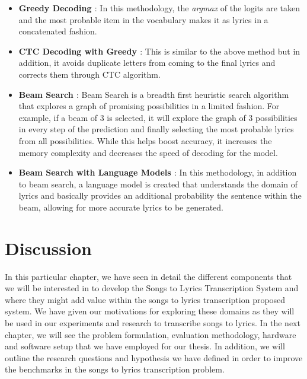 \begin{itemize}
    \item \textbf{Greedy Decoding \cite{zhang2023dive}} : In this methodology, the \textit{argmax} of the logits are taken and the most probable item in the vocabulary makes it as lyrics in a concatenated fashion.
    \item \textbf{CTC Decoding with Greedy \cite{sutskever2014sequence}}: This is similar to the above method but in addition, it avoids duplicate letters from coming to the final lyrics and corrects them through CTC algorithm.
    \item \textbf{Beam Search \cite{zhang2023dive}} : Beam Search is a breadth first heuristic search algorithm that explores a graph of promising possibilities in a limited fashion. For example, if a beam of 3 is selected, it will explore the graph of 3 possibilities in every step of the prediction and finally selecting the most probable lyrics from all possibilities. While this helps boost accuracy, it increases the memory complexity and decreases the speed of decoding for the model.
    \item  \textbf{Beam Search with Language Models \cite{sutskever2014sequence}}: In this methodology, in addition to beam search, a language model is created that understands the domain of lyrics and basically provides an additional probability the sentence within the beam, allowing for more accurate lyrics to be generated. 
\end{itemize}

\section{Discussion}%
\label{sec:foundationaltheorydiscussion}

In this particular chapter, we have seen in detail the different components that we will be interested in to develop the Songs to Lyrics Transcription System and where they might add value within the songs to lyrics transcription proposed system. We have given our motivations for exploring these domains as they will be used in our experiments and research to transcribe songs to lyrics. In the next chapter, we will see the problem formulation, evaluation methodology, hardware and software setup that we have employed for our thesis. In addition, we will outline the research questions and hypothesis we have defined in order to improve the benchmarks in the songs to lyrics transcription problem.